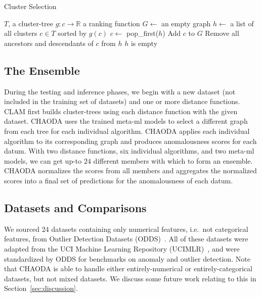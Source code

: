 \begin{algorithm}[h]
    \caption{Cluster Selection}
    \label{alg:cluster-selection}
\begin{algorithmic}[1]
    \REQUIRE $T$, a cluster-tree
    \REQUIRE $g : c \rightarrow \mathbb{R}$ a ranking function
    \STATE $G \gets$ an empty graph
    \STATE $h \gets$ a list of all clusters $c \in T$ sorted by $g(c)$
    \REPEAT
        \STATE $c \gets$ pop\_first($h$)
        \STATE Add $c$ to $G$
        \STATE Remove all ancestors and descendants of $c$ from $h$
    \UNTIL $h$ is empty
\end{algorithmic}
\end{algorithm}


\subsection{The Ensemble}
\label{subsec:methods:the-ensemble}

During the testing and inference phases, we begin with a new dataset (not included in the training set of datasets) and one or more distance functions.
CLAM first builds cluster-trees using each distance function with the given dataset.
CHAODA uses the trained meta-ml models to select a different graph from each tree for each individual algorithm.
CHAODA applies each individual algorithm to its corresponding graph and produces anomalousness scores for each datum.
With two distance functions, six individual algorithms, and two meta-ml models, we can get up-to $24$ different members with which to form an ensemble.
CHAODA normalizes the scores from all members and aggregates the normalized scores into a final set of predictions for the anomalousness of each datum.


\subsection{Datasets and Comparisons}
\label{subsec:methods:datasets-and-comparisons}

We sourced 24 datasets containing only numerical features, i.e.\ not categorical features, from Outlier Detection Datasets (ODDS)~\cite{rayana2016odds}.
All of these datasets were adapted from the UCI Machine Learning Repository (UCIMLR)~\cite{UCIMLR}, and were standardized by ODDS for benchmarks on anomaly and outlier detection.
Note that CHAODA is able to handle either entirely-numerical or entirely-categorical datasets, but not mixed datasets.
We discuss some future work relating to this in Section~\ref{sec:discussion}.

